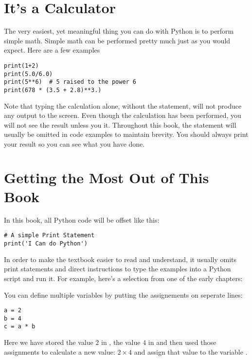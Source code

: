 \section{It's a Calculator}
The very easiest, yet meaningful thing you can do with Python is to
perform simple math. Simple math can be performed pretty much just as
you would expect. Here are a few examples
\begin{Verbatim}
print(1+2)
print(5.0/6.0)
print(5**6)  # 5 raised to the power 6
print(678 * (3.5 + 2.8)**3.)
\end{Verbatim}
Note that typing the calculation alone, without the 
statement, will not produce any output to the screen.  Even though the
calculation has been performed, you will not see the result unless you
 it. Throughout this book, the 
statement will usually be omitted in code examples to maintain
brevity.  You should always print your result so you can see what you
have done.


\section{Getting the Most Out of This Book}
In this book, all Python code will be offset like this:
\begin{Verbatim}
# A simple Print Statement
print('I Can do Python')
\end{Verbatim}

In order to make the textbook easier to read and understand, it usually omits print statements and direct instructions to type the examples into a Python script and run it.  For example, here's a selection from one of the early chapters:

\vspace*{\baselineskip}

\begin{minipage}{0.9\textwidth} \footnotesize
You can define multiple variables by putting the assignements on
seperate lines:
\begin{Verbatim}
a = 2
b = 4
c = a * b
\end{Verbatim}
Here we have stored the value $2$ in , the value $4$ in
 and then used those assignments to calculate a new value: $ 2
\times 4$ and assign that value to the variable .

\end{minipage}

